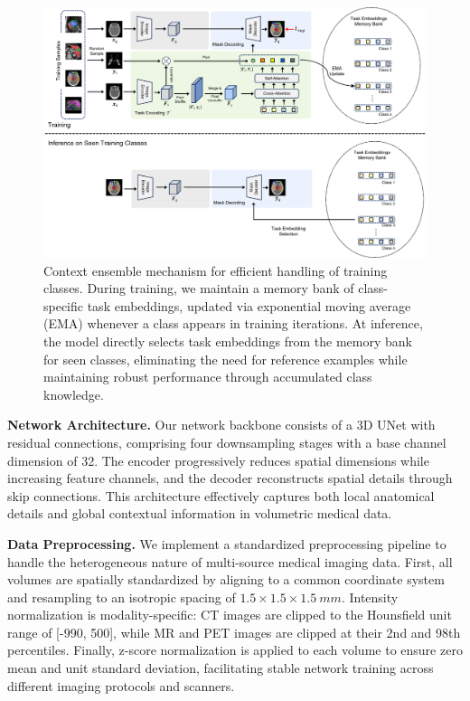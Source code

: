 \begin{figure}[ht]
\begin{center}
\includegraphics[width=\textwidth]{./fig/supp_context_ensemble.pdf}
\end{center}
\vspace{-1em}
\caption{Context ensemble mechanism for efficient handling of training classes. During training, we maintain a memory bank of class-specific task embeddings, updated via exponential moving average (EMA) whenever a class appears in training iterations. At inference, the model directly selects task embeddings from the memory bank for seen classes, eliminating the need for reference examples while maintaining robust performance through accumulated class knowledge.}
\label{fig:supp_context_ensemble}
\vspace{-1em}
\end{figure}


\noindent\textbf{Network Architecture.} Our network backbone consists of a 3D UNet with residual connections, comprising four downsampling stages with a base channel dimension of 32. The encoder progressively reduces spatial dimensions while increasing feature channels, and the decoder reconstructs spatial details through skip connections. This architecture effectively captures both local anatomical details and global contextual information in volumetric medical data.

\noindent\textbf{Data Preprocessing.} We implement a standardized preprocessing pipeline to handle the heterogeneous nature of multi-source medical imaging data. First, all volumes are spatially standardized by aligning to a common coordinate system and resampling to an isotropic spacing of $1.5\times 1.5 \times 1.5\ mm$. Intensity normalization is modality-specific: CT images are clipped to the Hounsfield unit range of [-990, 500], while MR and PET images are clipped at their 2nd and 98th percentiles. Finally, z-score normalization is applied to each volume to ensure zero mean and unit standard deviation, facilitating stable network training across different imaging protocols and scanners.

